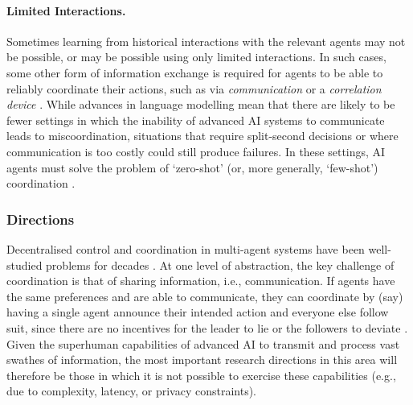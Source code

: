 \paragraph{Limited Interactions.}
Sometimes learning from historical interactions with the relevant agents may not be possible, or may be possible using only {limited interactions}.
In such cases, some other form of information exchange is required for agents to be able to reliably coordinate their actions, such as via \emph{communication} \citep{Crawford1982,Farrell1996} or a \emph{correlation device} \citep{aumann1974, aumann1987}.
While advances in language modelling mean that there are likely to be fewer settings in which the inability of advanced AI systems to communicate leads to miscoordination, situations that require split-second decisions or where communication is too costly could still produce failures.
In these settings, AI agents must solve the problem of `zero-shot' (or, more generally, `few-shot') coordination \citep{Stone2010,Hu2020,Treutlein2021,Zhu2021,Emmons2022}.

\subsubsection{Directions}

Decentralised control and coordination in multi-agent systems have been well-studied problems for decades \citep{boutilier1996planning,Peshkin2000,Stone2010,Omidshafiei2017,Rashid2018,Oroojlooy2022}.
At one level of abstraction, the key challenge of coordination is that of sharing information, i.e., communication. If agents
have the same preferences and are able to communicate, they can coordinate by (say) having
a single agent announce their intended action and everyone else follow suit, since there are no
incentives for the leader to lie or the followers to deviate \citep[e.g.,][]{farrell1996cheap}.
Given the superhuman capabilities of advanced AI to transmit and process vast swathes of information, the most important research directions in this area will therefore be those in which it is not possible to exercise these capabilities (e.g., due to complexity, latency, or privacy constraints).

